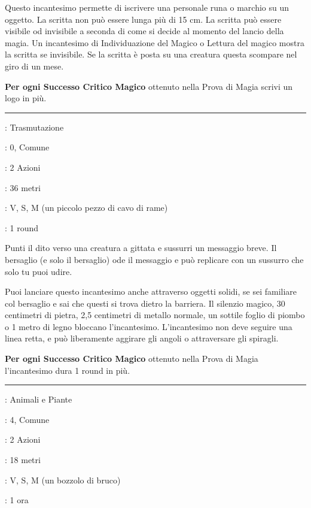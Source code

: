 \begin{multicols}{2}
Questo incantesimo permette di iscrivere una personale runa o marchio su un oggetto. La scritta non può essere lunga più di 15 cm. La scritta può essere visibile od invisibile a seconda di come si decide al momento del lancio della magia.
Un incantesimo di Individuazione del Magico o Lettura del magico mostra la scritta se invisibile.
Se la scritta è posta su una creatura questa scompare nel giro di un mese.

\textbf{Per ogni Successo Critico Magico} ottenuto nella Prova di Magia scrivi un logo in più.

\smallskip\noindent\rule{\linewidth}{2pt} \hypertarget{Messaggio}{}\smallskip{}
\noindent
\begin{description}[noitemsep, topsep=0pt, parsep=0pt, partopsep=0pt, leftmargin=0cm, labelwidth=2.8cm]
	\item[\textbf{Lista di Magia}]: Trasmutazione
	\item[\textbf{Livello}]: 0, Comune
	\item[\textbf{T. di Lancio}]: 2 Azioni
	\item[\textbf{Gittata}]: 36 metri
	\item[\textbf{Componenti}]: V, S, M (un piccolo pezzo di cavo di rame)
	\item[\textbf{Durata}]: 1 round
\end{description}

Punti il dito verso una creatura a gittata e sussurri un messaggio breve. Il bersaglio (e solo il bersaglio) ode il messaggio e può replicare con un sussurro che solo tu puoi udire.

Puoi lanciare questo incantesimo anche attraverso oggetti solidi, se sei familiare col bersaglio e sai che questi si trova dietro la barriera. Il silenzio magico, 30 centimetri di pietra, 2,5 centimetri di metallo normale, un sottile foglio di piombo o 1 metro di legno bloccano l'incantesimo. L'incantesimo non deve seguire una linea retta, e può liberamente aggirare gli angoli o attraversare gli spiragli.

\textbf{Per ogni Successo Critico Magico} ottenuto nella Prova di Magia l'incantesimo dura 1 round in più.

\smallskip\noindent\rule{\linewidth}{2pt} \hypertarget{Metamorfosi}{}\smallskip{}
\noindent
\begin{description}[noitemsep, topsep=0pt, parsep=0pt, partopsep=0pt, leftmargin=0cm, labelwidth=2.8cm]
	\item[\textbf{Lista di Magia}]: Animali e Piante
	\item[\textbf{Livello}]: 4, Comune
	\item[\textbf{T. di Lancio}]: 2 Azioni
	\item[\textbf{Gittata}]: 18 metri
	\item[\textbf{Componenti}]: V, S, M (un bozzolo di bruco)
	\item[\textbf{Durata}]: 1 ora
\end{description}


\end{multicols}

